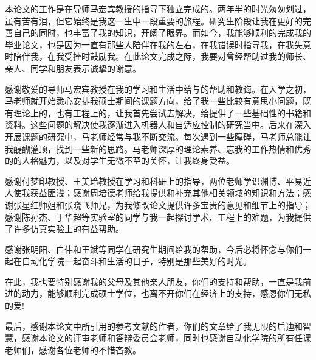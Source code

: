 
\begin{thanks}

本论文的工作是在导师马宏宾教授的指导下独立完成的。两年半的时光匆匆划过，虽有苦有泪，但它始终是我这一生中一段重要的旅程。研究生阶段让我在更好的完善自己的同时，也丰富了我的知识，开阔了眼界。而如今，我能够顺利的完成我的毕业论文，也是因为一直有那些人陪伴在我的左右，在我错误时指导我，在我失意时陪伴我，在我受挫时鼓励我。在此论文完成之际，我要对曾经帮助过我的师长、亲人、同学和朋友表示诚挚的谢意。

感谢敬爱的导师马宏宾教授在我的学习和生活中给与的帮助和教诲。在入学之初，马老师就开始悉心安排我硕士期间的课题方向，给了我一些比较有意思小问题，既有理论上的，也有工程上的，让我首先尝试去解决，给提供了一些基础性的书籍和资料。这些问题的解决使我逐渐进入机器人和自适应控制的研究当中。后来在深入开展课题的研究中，马老师经常与我不断交流。每次遇到一些障碍，马老师总能让我醍醐灌顶，找到一些新的思路。马老师深厚的理论素养、忘我的工作热情和优秀的的人格魅力，以及对学生无微不至的关怀，让我终身受益。

感谢付梦印教授、王美玲教授在学习和科研上的指导，两位老师学识渊博、平易近人使我获益匪浅；感谢周培德老师给我提供和补充其他相关领域的知识和方法；感谢张星红师姐和张晓飞师兄，为我修改论文提供许多宝贵的意见和细节上的指导；感谢陈孙杰、于华超等实验室的同学与我一起探讨学术、工程上的难题，为我提供了许多仿真实验上的有益帮助。

感谢张明阳、白伟和王斌等同学在研究生期间给我的帮助，今后必将怀念与你们一起在自动化学院一起奋斗和生活的日子，特别是那些美好的时光。

在此，我也要特别感谢我的父母及其他亲人朋友，你们的支持和帮助，一直是我前进的动力，能够顺利完成硕士学位，也离不开你们在经济上的支持，感恩你们无私的爱!

最后，感谢本论文中所引用的参考文献的作者，你们的文章给了我无限的启迪和智慧，感谢本论文的评审老师和答辩委员会老师，同时也感谢自动化学院的所有任课老师们，感谢各位老师的不惜吝教。

\end{thanks}
